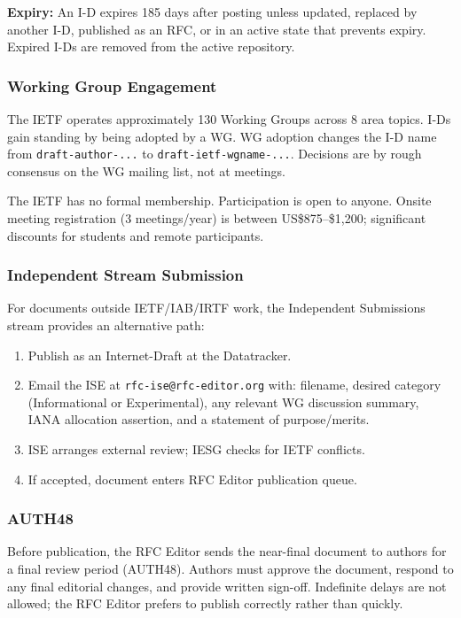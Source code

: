 \documentclass[11pt,letterpaper]{article}
\begin{document}
\textbf{Expiry:} An I-D expires 185 days after posting unless updated, replaced by another I-D, published as an RFC, or in an active state that prevents expiry. Expired I-Ds are removed from the active repository.

\subsubsection{Working Group Engagement}

The IETF operates approximately 130 Working Groups across 8 area topics. I-Ds gain standing by being adopted by a WG. WG adoption changes the I-D name from \texttt{draft-{author}-...} to \texttt{draft-ietf-{wgname}-...}. Decisions are by rough consensus on the WG mailing list, not at meetings.

The IETF has no formal membership. Participation is open to anyone. Onsite meeting registration (3 meetings/year) is between US\$875--\$1,200; significant discounts for students and remote participants.

\subsubsection{Independent Stream Submission}

For documents outside IETF/IAB/IRTF work, the Independent Submissions stream provides an alternative path:

\begin{enumerate}
  \item Publish as an Internet-Draft at the Datatracker.
  \item Email the ISE at \texttt{rfc-ise@rfc-editor.org} with: filename, desired category (Informational or Experimental), any relevant WG discussion summary, IANA allocation assertion, and a statement of purpose/merits.
  \item ISE arranges external review; IESG checks for IETF conflicts.
  \item If accepted, document enters RFC Editor publication queue.
\end{enumerate}

\subsubsection{AUTH48}

Before publication, the RFC Editor sends the near-final document to authors for a final review period (AUTH48). Authors must approve the document, respond to any final editorial changes, and provide written sign-off. Indefinite delays are not allowed; the RFC Editor prefers to publish correctly rather than quickly.
\end{document}
